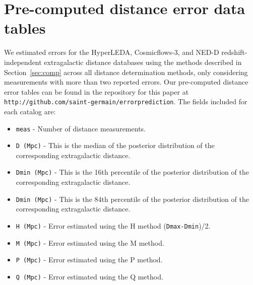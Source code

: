 \documentclass[a4paper,fleqn,usenatbib]{mnras}
\begin{document}


\appendix

\section{Pre-computed distance error data tables}
We estimated errors for the HyperLEDA, Cosmicflows-3, and NED-D redshift-independent extragalactic distance databases using the methods described in Section~\ref{sec:comp} across all distance determination methods, only considering measurements with more than two reported errors. Our pre-computed distance error tables can be found in the repository for this paper at \texttt{http://github.com/saint-germain/errorprediction}. The fields included for each catalog are:
\begin{itemize}
\item \texttt{meas} - Number of distance measurements.
\item \texttt{D (Mpc)} - This is the median of the posterior distribution of the corresponding extragalactic distance.
\item \texttt{Dmin (Mpc)} - This is the 16th percentile of the posterior distribution of the corresponding extragalactic distance.
\item \texttt{Dmin (Mpc)} - This is the 84th percentile of the posterior distribution of the corresponding extragalactic distance.
\item \texttt{H (Mpc)} - Error estimated using the H method (\texttt{Dmax-Dmin})/2.
\item \texttt{M (Mpc)} - Error estimated using the M method. 
\item \texttt{P (Mpc)} - Error estimated using the P method. 
\item \texttt{Q (Mpc)} - Error estimated using the Q method. 
\end{itemize}
\end{document}
